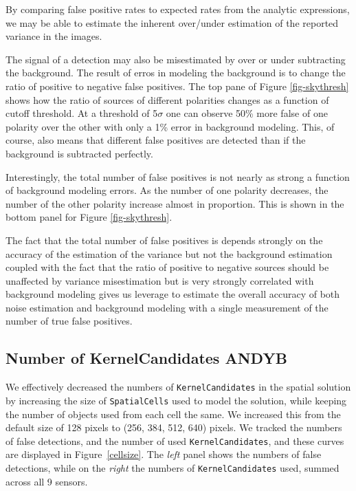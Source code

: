 \documentclass[prd, nofootinbib, floatfix, 11pt,tightenlines,times]{article}
\begin{document}
By comparing false positive rates to expected rates from the analytic expressions, we may be able to
estimate the inherent over/under estimation of the reported variance in the images.

The signal of a detection may also be misestimated by over or under subtracting the background.  
The result of erros in modeling the background is to change the ratio of positive to negative
false positives.  The top pane of Figure \ref{fig-skythresh} shows how the ratio of sources of 
different polarities changes as a function of cutoff threshold.  At a threshold of 5$\sigma$
one can observe 50\% more false of one polarity over the other with only a 1\% error in background
modeling.  This, of course, also means that different false positives are detected than if the
background is subtracted perfectly.

Interestingly, the total number of false positives is not nearly as strong a function of background 
modeling errors.  As the number of one polarity decreases, the number of the other polarity increase
almost in proportion.  This is shown in the bottom panel for Figure \ref{fig-skythresh}.

The fact that the total number of false positives is depends strongly on the accuracy of the estimation
of the variance but not the background estimation coupled with the fact that the ratio of positive to negative
sources should be unaffected by variance misestimation but is very strongly correlated with background
modeling gives us leverage to estimate the overall accuracy of both noise estimation and background modeling with
a single measurement of the number of true false positives.



\subsection{Number of KernelCandidates {\bf ANDYB}}

We effectively decreased the numbers of {\tt KernelCandidates} in the
spatial solution by increasing the size of {\tt SpatialCells} used to
model the solution, while keeping the number of objects used from each
cell the same.  We increased this from the default size of 128 pixels
to (256, 384, 512, 640) pixels.  We tracked the numbers of false
detections, and the number of used {\tt KernelCandidates}, and these
curves are displayed in Figure~\ref{cellsize}.  The {\it left} panel
shows the numbers of false detections, while on the {\it right} the
numbers of {\tt KernelCandidates} used, summed across all 9 sensors.
\end{document}
